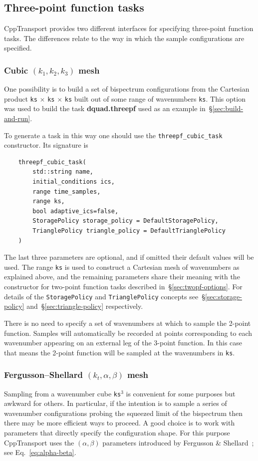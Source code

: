 \documentclass[11pt,a4paper]{article}
\newcommand{\repoobject}[1]{{\ttfamily\bfseries\small #1}}
\newcommand{\packagefont}{\sffamily}
\newcommand{\CppTransport}{{\packagefont CppTransport}}
\begin{document}
\subsection{Three-point function tasks}
\label{sec:threepf-options}
{\CppTransport} provides two different interfaces for
specifying three-point function tasks.
The differences relate to the way in which the sample configurations are specified.

\subsubsection{Cubic $(k_1, k_2, k_3)$ mesh}
One possibility is to build a set of bispectrum configurations from
the Cartesian product
\texttt{ks} $\times$
\texttt{ks} $\times$
\texttt{ks}
built out of some range of wavenumbers
\texttt{ks}.
This option was used to build the task
\repoobject{dquad.threepf} used as an example in~\S\ref{sec:build-and-run}.

To generate a task in this way one should use the
\texttt{threepf_cubic_task} constructor. Its signature is
\begin{verbatim}
    threepf_cubic_task(
        std::string name,
        initial_conditions ics,
        range time_samples,
        range ks,
        bool adaptive_ics=false,
        StoragePolicy storage_policy = DefaultStoragePolicy,
        TrianglePolicy triangle_policy = DefaultTrianglePolicy
    )
\end{verbatim}
The last three parameters are optional, and if omitted their
default values will be used.
The range \texttt{ks} is used to construct a Cartesian mesh
of wavenumbers as explained above, and the remaining parameters
share their meaning with the constructor for two-point function tasks
described in~\S\ref{sec:twopf-options}.
For details of the
\texttt{StoragePolicy} and
\texttt{TrianglePolicy} concepts
see~\S\ref{sec:storage-policy} and~\S\ref{sec:triangle-policy} respectively.

There is no need to specify a set of wavenumbers at which to sample the 2-point function.
Samples will automatically be recorded at points corresponding to each wavenumber appearing
on an external leg of the 3-point function.
In this case that means the 2-point function will be sampled at the wavenumbers
in \texttt{ks}.

\subsubsection{Fergusson--Shellard $(k_t, \alpha, \beta)$ mesh}
Sampling from a wavenumber cube \texttt{ks}$^3$
is convenient for some purposes but awkward for others.
In particular, if the intention is to sample a series of wavenumber configurations
probing the squeezed limit of the bispectrum then there may be more efficient
ways to proceed.
A good choice is to work with parameters that directly specify the configuration
shape.
For this purpose {\CppTransport} uses the $(\alpha, \beta)$ parameters
introduced by Fergusson \& Shellard~\cite{Fergusson:2006pr}; see Eq.~\eqref{eq:alpha-beta}.
\end{document}
